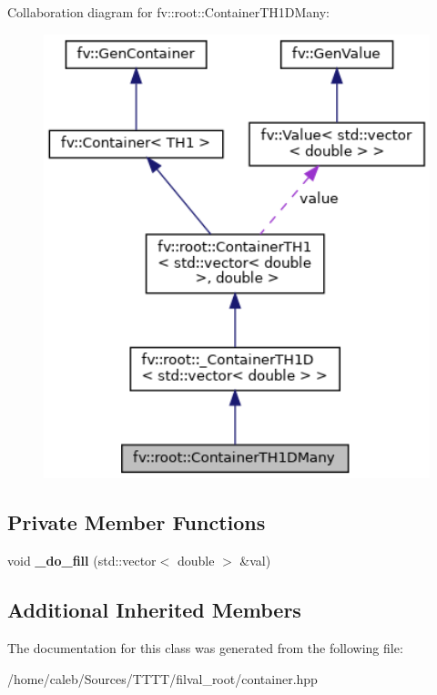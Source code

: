 Collaboration diagram for fv\+:\+:root\+:\+:Container\+T\+H1\+D\+Many\+:
\nopagebreak
\begin{figure}[H]
\begin{center}
\leavevmode
\includegraphics[width=342pt]{classfv_1_1root_1_1ContainerTH1DMany__coll__graph}
\end{center}
\end{figure}
\subsection*{Private Member Functions}
\begin{DoxyCompactItemize}
\item 
\hypertarget{classfv_1_1root_1_1ContainerTH1DMany_aa0b62d95327e836a79c50b1d637777e9}{}\label{classfv_1_1root_1_1ContainerTH1DMany_aa0b62d95327e836a79c50b1d637777e9} 
void {\bfseries \+\_\+do\+\_\+fill} (std\+::vector$<$ double $>$ \&val)
\end{DoxyCompactItemize}
\subsection*{Additional Inherited Members}


The documentation for this class was generated from the following file\+:\begin{DoxyCompactItemize}
\item 
/home/caleb/\+Sources/\+T\+T\+T\+T/filval\+\_\+root/container.\+hpp\end{DoxyCompactItemize}
